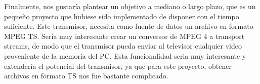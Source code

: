 Finalmente, nos gustaría plantear un objetivo a mediano o largo plazo, que es un pequeño proyecto que hubiese sido implementado de disponer con el tiempo suficiente. Este transmisor, necesita como fuente de datos un archivo en formato MPEG TS. Seria muy interesante crear un conversor de MPEG 4 a transport streams, de modo que el transmisor pueda  enviar al televisor cualquier video proveniente de la memoria del PC. Esta funcionalidad seria muy interesante y extendería el potencial del transmisor, ya que para este proyecto, obtener archivos en formato TS nos fue bastante complicado.